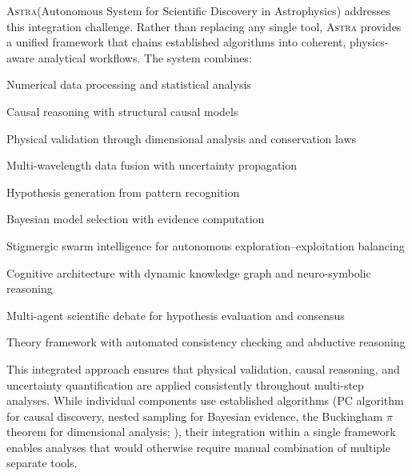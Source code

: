 \documentclass[usenatbib]{rasti}
\newcommand{\astra}{\textsc{Astra}\xspace}
\newcommand{\pc}{PC\xspace}
\begin{document}
\astra (Autonomous System for Scientific Discovery in Astrophysics) addresses this integration challenge.
Rather than replacing any single tool, \astra provides a unified framework that chains established algorithms into coherent, physics-aware analytical workflows.
The system combines:
\begin{description}
  \item Numerical data processing and statistical analysis
  \item Causal reasoning with structural causal models
  \item Physical validation through dimensional analysis and conservation laws
  \item Multi-wavelength data fusion with uncertainty propagation
  \item Hypothesis generation from pattern recognition
  \item Bayesian model selection with evidence computation
  \item Stigmergic swarm intelligence for autonomous exploration--exploitation balancing
  \item Cognitive architecture with dynamic knowledge graph and neuro-symbolic reasoning
  \item Multi-agent scientific debate for hypothesis evaluation and consensus
  \item Theory framework with automated consistency checking and abductive reasoning
\end{description}

This integrated approach ensures that physical validation, causal reasoning, and uncertainty quantification are applied consistently throughout multi-step analyses.
While individual components use established algorithms (\pc algorithm for causal discovery, nested sampling for Bayesian evidence, the Buckingham $\pi$ theorem for dimensional analysis; \citealt{Buckingham1914}), their integration within a single framework enables analyses that would otherwise require manual combination of multiple separate tools.
\end{document}
